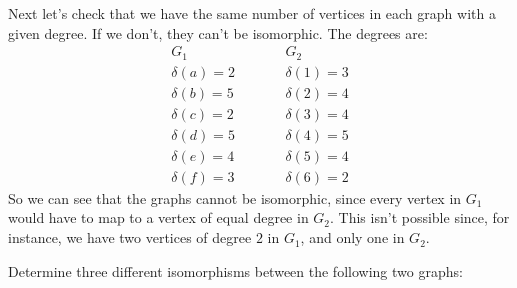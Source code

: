 \begin{questions}
\begin{solution}
    Next let's check that we have the same number of vertices in each graph with a given degree.
    If we don't, they can't be isomorphic.
    The degrees are:
    \begin{align*}
      &G_1& \qquad &G_2& \\
      &\delta(a) = 2& &\delta(1) = 3& \\
      &\delta(b) = 5& &\delta(2) = 4& \\
      &\delta(c) = 2& &\delta(3) = 4& \\
      &\delta(d) = 5& &\delta(4) = 5& \\
      &\delta(e) = 4& &\delta(5) = 4& \\
      &\delta(f) = 3& &\delta(6) = 2&
    \end{align*}
    So we can see that the graphs cannot be isomorphic, since every vertex in $G_1$ would have to map to a vertex of equal degree in $G_2$.
    This isn't possible since, for instance, we have two vertices of degree $2$ in $G_1$, and only one in $G_2$.
  \end{solution}

\question
  Determine three different isomorphisms between the following two graphs:
  \begin{center}
    \hspace{1.5cm}
  \end{center}


\end{questions}
